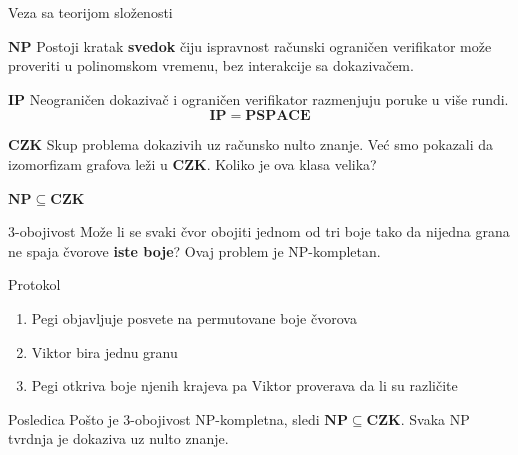 ﻿\documentclass[aspectratio=1610]{beamer}
\newcommand{\keyword}[1]{\textcolor{wcprimary}{\textbf{#1}}}
\begin{document}
\begin{frame}{Veza sa teorijom složenosti}
\vspace{4pt}
\begin{block}{\normalsize $\mathbf{NP}$}
  Postoji kratak \keyword{svedok} čiju ispravnost računski ograničen verifikator
  može proveriti u polinomskom vremenu, bez interakcije sa dokazivačem.
\end{block}
\begin{alertblock}{\normalsize $\mathbf{IP}$}
  Neograničen dokazivač i ograničen verifikator razmenjuju poruke u više rundi.
  \[
    \mathbf{IP} = \mathbf{PSPACE}
  \]
\end{alertblock}
\begin{exampleblock}{\normalsize $\mathbf{CZK}$}
  Skup problema dokazivih uz računsko nulto znanje.
  Već smo pokazali da izomorfizam grafova leži u $\mathbf{CZK}$.
  Koliko je ova klasa velika?
\end{exampleblock}
\end{frame}

\begin{frame}{$\mathbf{NP} \subseteq \mathbf{CZK}$}
\begin{block}{\normalsize 3-obojivost}
  Može li se svaki čvor obojiti jednom od tri boje tako da nijedna grana
  ne spaja čvorove \keyword{iste boje}? Ovaj problem je NP-kompletan.
\end{block}
\begin{alertblock}{\normalsize Protokol}
  \begin{enumerate}\itemsep2pt
    \item Pegi objavljuje posvete na permutovane boje čvorova
    \item Viktor bira jednu granu
    \item Pegi otkriva boje njenih krajeva pa Viktor proverava da li su različite
  \end{enumerate}
\end{alertblock}
\begin{exampleblock}{\normalsize Posledica}
  Pošto je 3-obojivost NP-kompletna, sledi $\mathbf{NP} \subseteq \mathbf{CZK}$.
  Svaka NP tvrdnja je dokaziva uz nulto znanje.
\end{exampleblock}
\end{frame}
\end{document}
